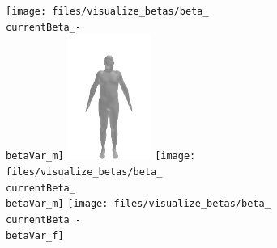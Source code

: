 \begin{figure}[h!]
    \def\betaVar{3}
    \def\imgWidth{0.3\textwidth}
    \def\betaWidth{0.3\textwidth}
    \centering
    \begin{subfigure}{\betaWidth}
        \def\currentBeta{0}
        \centering
        \texttt{[image: files/visualize\_betas/beta\_\\currentBeta\_-\\betaVar\_m]}
        \includegraphics[width=\imgWidth]{files/visualize_betas/baseline_m}
        \texttt{[image: files/visualize\_betas/beta\_\\currentBeta\_\\betaVar\_m]}
        \linebreak
        \texttt{[image: files/visualize\_betas/beta\_\\currentBeta\_-\\betaVar\_f]}

\end{subfigure}
\end{figure}
